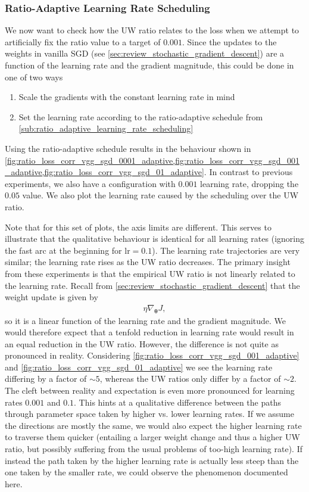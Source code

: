 \subsubsection{Ratio-Adaptive Learning Rate Scheduling}

We now want to check how the UW ratio relates to the loss when we attempt to
artificially fix the ratio value to a target of $0.001$. Since the updates to the
weights in vanilla SGD (see \cref{sec:review_stochastic_gradient_descent}) are a
function of the learning rate and the gradient magnitude, this could be done in
one of two ways
\begin{enumerate}
    \item Scale the gradients with the constant learning rate in mind
    \item Set the learning rate according to the ratio-adaptive schedule from
        \cref{sub:ratio_adaptive_learning_rate_scheduling}
\end{enumerate}

Using the ratio-adaptive schedule results in the behaviour shown in
\cref{fig:ratio_loss_corr_vgg_sgd_0001_adaptive,fig:ratio_loss_corr_vgg_sgd_001_adaptive,fig:ratio_loss_corr_vgg_sgd_01_adaptive}.
In contrast to previous experiments, we also have a configuration with $0.001$
learning rate, dropping the $0.05$ value. We also plot the learning rate caused
by the scheduling over the UW ratio.

Note that for this set of plots, the axis limits are different. This serves to
illustrate that the qualitative behaviour is identical for all learning rates
(ignoring the fast arc at the beginning for $\text{lr}=0.1$). The learning rate
trajectories are very similar; the learning rate rises as the UW ratio
decreases. The primary insight from these experiments is that the empirical UW ratio is
not linearly related to the learning rate. Recall from
\cref{sec:review_stochastic_gradient_descent} that the weight update is given by
\begin{align}
    \eta \nabla_{\boldsymbol\theta}J,
\end{align}
so it is a linear function of the learning rate and the gradient magnitude. We
would therefore expect that a tenfold reduction in learning rate would result in
an equal reduction in the UW ratio. However, the difference is not quite as
pronounced in reality. Considering
\cref{fig:ratio_loss_corr_vgg_sgd_001_adaptive} and
\cref{fig:ratio_loss_corr_vgg_sgd_01_adaptive} we see the learning rate
differing by a factor of $\sim{}5$, whereas the UW ratios only differ by a factor of
$\sim{}2$. The cleft between reality and expectation is even more pronounced for
learning rates $0.001$ and $0.1$. This hints at a qualitative difference between
the paths through parameter space taken by higher vs. lower learning rates. If
we assume the directions are mostly the same, we would also expect the higher
learning rate to traverse them quicker (entailing a larger weight change and
thus a higher UW ratio, but possibly suffering from the usual problems of
too-high learning rate). If instead the path taken by the higher learning rate
is actually less steep than the one taken by the smaller rate, we could observe
the phenomenon documented here.

